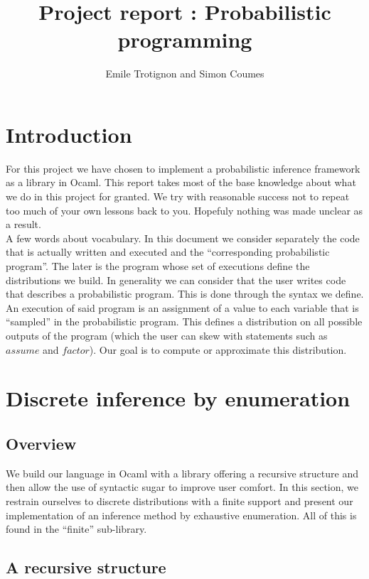 \documentclass{article}
\title{Project report : Probabilistic programming}
\author{Emile Trotignon and Simon Coumes}
\begin{document}
\maketitle

\section{Introduction}

	For this project we have chosen to implement a probabilistic inference framework as a library in Ocaml.
	This report takes most of the base knowledge about what we do in this project for granted.
	We try with reasonable success not to repeat too much of your own lessons back to you. 
	Hopefuly nothing was made unclear as a result. \\

	A few words about vocabulary.
	In this document we consider separately the code that is actually written and executed and the ``corresponding probabilistic program''.
	The later is the program whose set of executions define the distributions we build.
	In generality we can consider that the user writes code that describes a probabilistic program. 
	This is done through the syntax we define.
	An execution of said program is an assignment of a value to each variable that is ``sampled'' in the probabilistic program. 
	This defines a distribution on all possible outputs of the program (which the user can skew with statements such as $assume$ and $factor$). Our goal is to compute or approximate this distribution. 

\section{Discrete inference by enumeration}

	\subsection{Overview}

	We build our language in Ocaml with a library offering a recursive structure and then allow the use of syntactic sugar to improve user comfort.
	In this section, we restrain ourselves to discrete distributions with a finite support and present our implementation of an inference method by exhaustive enumeration.
	All of this is found in the ``finite'' sub-library.

	\subsection{A recursive structure}
\end{document}
